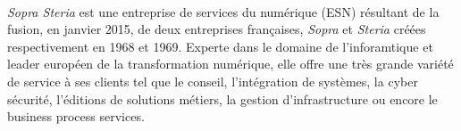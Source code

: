 \paragraph{}

\textit{Sopra Steria} est une entreprise de services du numérique (ESN) résultant de la fusion, en janvier 2015, de deux entreprises françaises, \textit{Sopra} et \textit{Steria} créées respectivement en 1968 et 1969. Experte dans le domaine de l'inforamtique et leader européen de la transformation numérique, elle offre une très grande variété de service à ses clients tel que le conseil, l'intégration de systèmes, la cyber sécurité, l'éditions de solutions métiers, la gestion d'infrastructure ou encore le business process services.  